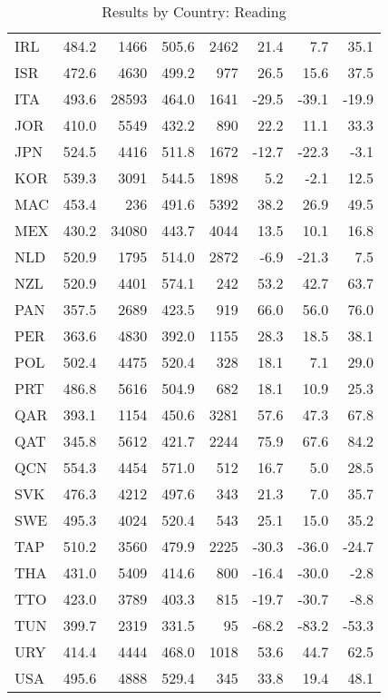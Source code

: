 \begin{table}[ht]
\begin{center}
{\begin{tabular}{lrr@{\extracolsep{10pt}}rr@{\extracolsep{10pt}}rrr}
  IRL & 484.2 & 1466 & 505.6 & 2462 & 21.4 & 7.7 & 35.1 \\ 
  ISR & 472.6 & 4630 & 499.2 & 977 & 26.5 & 15.6 & 37.5 \\ 
  ITA & 493.6 & 28593 & 464.0 & 1641 & -29.5 & -39.1 & -19.9 \\ 
  JOR & 410.0 & 5549 & 432.2 & 890 & 22.2 & 11.1 & 33.3 \\ 
  JPN & 524.5 & 4416 & 511.8 & 1672 & -12.7 & -22.3 & -3.1 \\ 
  KOR & 539.3 & 3091 & 544.5 & 1898 & 5.2 & -2.1 & 12.5 \\ 
  MAC & 453.4 & 236 & 491.6 & 5392 & 38.2 & 26.9 & 49.5 \\ 
  MEX & 430.2 & 34080 & 443.7 & 4044 & 13.5 & 10.1 & 16.8 \\ 
  NLD & 520.9 & 1795 & 514.0 & 2872 & -6.9 & -21.3 & 7.5 \\ 
  NZL & 520.9 & 4401 & 574.1 & 242 & 53.2 & 42.7 & 63.7 \\ 
  PAN & 357.5 & 2689 & 423.5 & 919 & 66.0 & 56.0 & 76.0 \\ 
  PER & 363.6 & 4830 & 392.0 & 1155 & 28.3 & 18.5 & 38.1 \\ 
  POL & 502.4 & 4475 & 520.4 & 328 & 18.1 & 7.1 & 29.0 \\ 
  PRT & 486.8 & 5616 & 504.9 & 682 & 18.1 & 10.9 & 25.3 \\ 
  QAR & 393.1 & 1154 & 450.6 & 3281 & 57.6 & 47.3 & 67.8 \\ 
  QAT & 345.8 & 5612 & 421.7 & 2244 & 75.9 & 67.6 & 84.2 \\ 
  QCN & 554.3 & 4454 & 571.0 & 512 & 16.7 & 5.0 & 28.5 \\ 
  SVK & 476.3 & 4212 & 497.6 & 343 & 21.3 & 7.0 & 35.7 \\ 
  SWE & 495.3 & 4024 & 520.4 & 543 & 25.1 & 15.0 & 35.2 \\ 
  TAP & 510.2 & 3560 & 479.9 & 2225 & -30.3 & -36.0 & -24.7 \\ 
  THA & 431.0 & 5409 & 414.6 & 800 & -16.4 & -30.0 & -2.8 \\ 
  TTO & 423.0 & 3789 & 403.3 & 815 & -19.7 & -30.7 & -8.8 \\ 
  TUN & 399.7 & 2319 & 331.5 & 95 & -68.2 & -83.2 & -53.3 \\ 
  URY & 414.4 & 4444 & 468.0 & 1018 & 53.6 & 44.7 & 62.5 \\ 
  USA & 495.6 & 4888 & 529.4 & 345 & 33.8 & 19.4 & 48.1 \\ 
   \hline
\end{tabular}
}
\caption{Results by Country: Reading}
\label{level2read}
\end{center}
\end{table}
